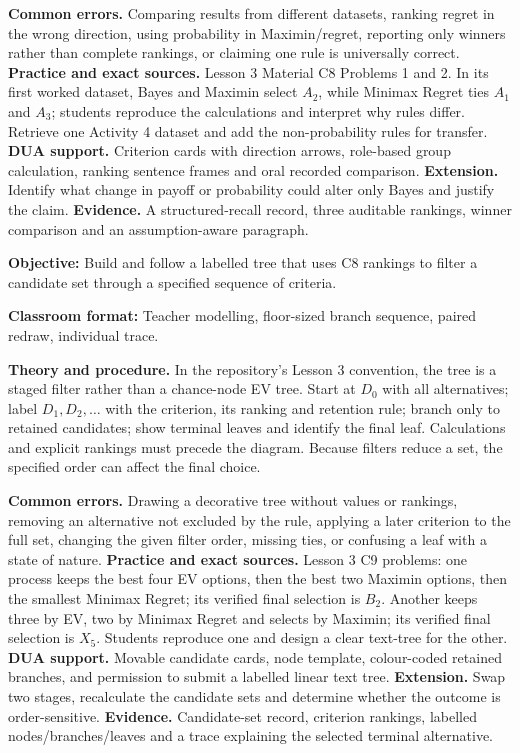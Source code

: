 \documentclass[10pt,letterpaper]{article}
\newcommand{\labelled}[2]{\textbf{#1:} #2\par}
\newcommand{\partheading}[1]{\Needspace{7\baselineskip}\par\vspace{4pt}{\bfseries #1\par}}
\begin{document}
\textbf{Common errors.} Comparing results from different datasets, ranking
regret in the wrong direction, using probability in Maximin/regret, reporting
only winners rather than complete rankings, or claiming one rule is universally
correct. \textbf{Practice and exact sources.} Lesson 3 Material C8 Problems 1
and 2. In its first worked dataset, Bayes and Maximin select $A_2$, while
Minimax Regret ties $A_1$ and $A_3$; students reproduce the calculations and
interpret why rules differ. Retrieve one Activity 4 dataset and add the
non-probability rules for transfer. \textbf{DUA support.} Criterion cards with
direction arrows, role-based group calculation, ranking sentence frames and
oral recorded comparison. \textbf{Extension.} Identify what change in payoff
or probability could alter only Bayes and justify the claim. \textbf{Evidence.}
A structured-recall record, three auditable rankings, winner comparison and an
assumption-aware paragraph.

\partheading{Part 2---C9: Use Rankings in a Staged Decision Tree}
\labelled{Objective}{Build and follow a labelled tree that uses C8 rankings to filter a candidate set through a specified sequence of criteria.}
\labelled{Classroom format}{Teacher modelling, floor-sized branch sequence, paired redraw, individual trace.}
\textbf{Theory and procedure.} In the repository's Lesson 3 convention, the
tree is a staged filter rather than a chance-node EV tree. Start at $D_0$ with
all alternatives; label $D_1,D_2,\ldots$ with the criterion, its ranking and
retention rule; branch only to retained candidates; show terminal leaves and
identify the final leaf. Calculations and explicit rankings must precede the
diagram. Because filters reduce a set, the specified order can affect the final
choice.

\textbf{Common errors.} Drawing a decorative tree without values or rankings,
removing an alternative not excluded by the rule, applying a later criterion
to the full set, changing the given filter order, missing ties, or confusing a
leaf with a state of nature. \textbf{Practice and exact sources.} Lesson 3 C9
problems: one process keeps the best four EV options, then the best two Maximin
options, then the smallest Minimax Regret; its verified final selection is
$B_2$. Another keeps three by EV, two by Minimax Regret and selects by Maximin;
its verified final selection is $X_5$. Students reproduce one and design a
clear text-tree for the other. \textbf{DUA support.} Movable candidate cards,
node template, colour-coded retained branches, and permission to submit a
labelled linear text tree. \textbf{Extension.} Swap two stages, recalculate the
candidate sets and determine whether the outcome is order-sensitive.
\textbf{Evidence.} Candidate-set record, criterion rankings, labelled
nodes/branches/leaves and a trace explaining the selected terminal alternative.
\end{document}
